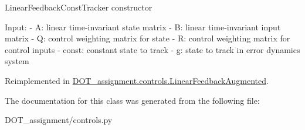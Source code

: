 \begin{DoxyVerb}LinearFeedbackConstTracker constructor

Input:
- A:            linear time-invariant state matrix
- B:            linear time-invariant input matrix
- Q:            control weighting matrix for state
- R:            control weighting matrix for control inputs
- const:        constant state to track
- g:            state to track in error dynamics system\end{DoxyVerb}
 

Reimplemented in \mbox{\hyperlink{class_d_o_t__assignment_1_1controls_1_1_linear_feedback_augmented_adaa4957b87782b3bd7df59ff4ab36080}{D\+O\+T\+\_\+assignment.\+controls.\+Linear\+Feedback\+Augmented}}.



The documentation for this class was generated from the following file\+:\begin{DoxyCompactItemize}
\item 
D\+O\+T\+\_\+assignment/controls.\+py\end{DoxyCompactItemize}
